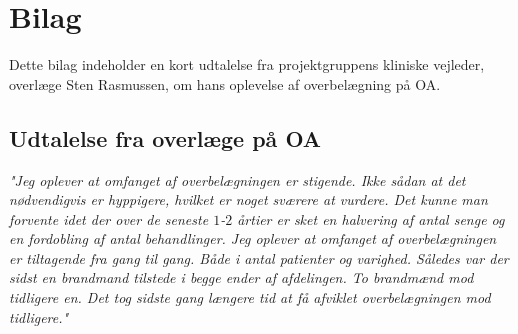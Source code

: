 \chapter{Bilag} \label{sten}
Dette bilag indeholder en kort udtalelse fra projektgruppens kliniske vejleder, overlæge Sten Rasmussen, om hans oplevelse af overbelægning på OA.
\section{Udtalelse fra overlæge på OA}
\textit{"Jeg oplever at omfanget af overbelægningen er stigende. Ikke sådan at det nødvendigvis er hyppigere, hvilket er noget sværere at vurdere. Det kunne man forvente idet der over de seneste $1$-$2$ årtier er sket en halvering af antal senge og en fordobling af antal behandlinger.
Jeg oplever at omfanget af overbelægningen er tiltagende fra gang til gang. Både i antal patienter og varighed. Således var der sidst en brandmand tilstede i begge ender af afdelingen. To brandmænd mod tidligere en. Det tog sidste gang længere tid at få afviklet overbelægningen mod tidligere."}